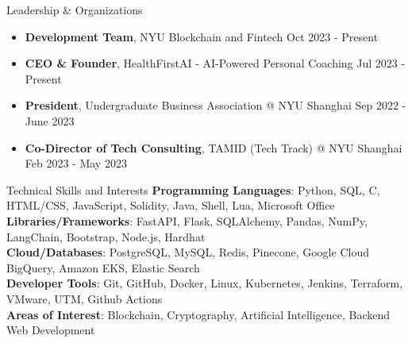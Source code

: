 \documentclass{resume} %
\begin{document}
\begin{rSection}{Leadership \& Organizations}
	\begin{itemize}
		\item \textbf{Development Team}{, NYU Blockchain and Fintech} \hfill Oct 2023 - Present
		\item \textbf{CEO \& Founder}{, HealthFirstAI - AI-Powered Personal Coaching} \hfill Jul 2023 - Present
		\item \textbf{President}{, Undergraduate Business Association @ NYU Shanghai} \hfill Sep 2022 - June 2023
		\item \textbf{Co-Director of Tech Consulting}{, TAMID (Tech Track) @ NYU Shanghai} \hfill Feb 2023 - May 2023
	\end{itemize}
\end{rSection}


\begin{rSection}{Technical Skills and Interests}
	\textbf{Programming Languages}{: Python, SQL, C, HTML/CSS, JavaScript, Solidity, Java, Shell, Lua, Microsoft Office} \\
	\textbf{Libraries/Frameworks}{: FastAPI, Flask, SQLAlchemy, Pandas, NumPy, LangChain, Bootstrap, Node.js, Hardhat} \\
	\textbf{Cloud/Databases}{: PostgreSQL, MySQL, Redis, Pinecone, Google Cloud BigQuery, Amazon EKS, Elastic Search} \\
	\textbf{Developer Tools}{: Git, GitHub, Docker, Linux, Kubernetes, Jenkins, Terraform, VMware, UTM, Github Actions} \\
	\textbf{Areas of Interest}{: Blockchain, Cryptography, Artificial Intelligence, Backend Web Development}
\end{rSection}
\end{document}
